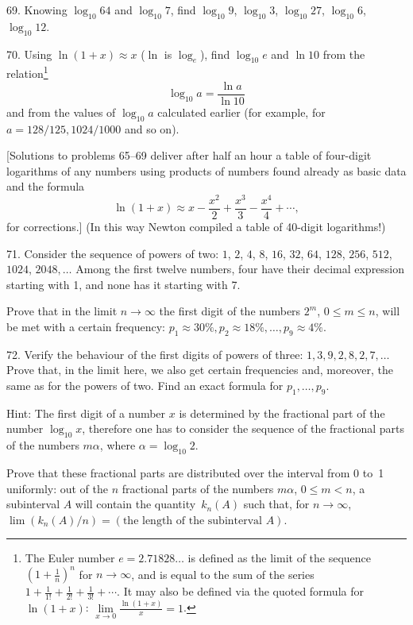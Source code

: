 \begin{problem}{69.}
	Knowing $\log_{10} 64$ and $\log_{10} 7$, find $\log_{10} 9$, $\log_{10} 3$,
    $\log_{10} 27$, $\log_{10} 6$, $\log_{10} 12$.
\end{problem}

\begin{problem}{70.}
	Using $\ln (1+x) \approx x$ ($\ln$ is $\log_e$), find $\log_{10} e$ and
    $\ln 10$ from the relation\footnote{The Euler number $e = 2{.}71828\dots$ is defined as the limit of the sequence
	$\left(1+\frac{1}{n}\right)^n$ for $n\to \infty$, and is equal to the sum of the series
	$1+\frac{1}{1!} +\frac{1}{2!}+\frac{1}{3!}+\dotsb$. It may also be defined via the quoted formula for
	 $\ln (1+x)$: $\lim\limits_{x\to 0}\frac{\ln(1+x)}{x} = 1$.}
	\begin{equation*}
		\log_{10} a=\frac{\ln a}{\ln 10}
	\end{equation*}
	and from the values of $\log_{10} a$ calculated earlier (for example, for $a=128/125, 1024/1000$
	and so on).

	[Solutions to problems 65--69 deliver after half an hour a table of four-digit logarithms of any numbers using
	products of numbers found already as basic data and the formula
	\begin{equation*}
		\ln (1+x) \approx x-\frac{x^2}{2}+\frac{x^3}{3}-\frac{x^4}{4}+\dotsb,
	\end{equation*}
	for corrections.] (In this way Newton compiled a table of
	40-digit logarithms!)
\end{problem}

\begin{problem}{71.}
	Consider the sequence of powers of two: $1$, $2$, $4$, $8$, $16$, $32$, $64$,
	$128$, $256$, $512$, $1024$, $2048, \dotsc$ Among the first twelve numbers, four have their decimal expression
	starting with 1, and none has it starting with 7.

	Prove that in the limit $n \to \infty$ the first digit of the numbers $2^m$,
	$0\leqslant m \leqslant n$, will be met with a certain frequency:
	$p_1 \approx 30\%, p_2 \approx 18\%, \dotsc, p_9 \approx 4\%$.
\end{problem}

\begin{problem}{72.}
	Verify the behaviour of the first digits of powers of three: $1,
	3, 9, 2, 8, 2, 7, \dotsc$ Prove that, in the limit here, we also
	get certain frequencies and, moreover, the same as for the powers of two.
	Find an exact formula for $p_1, \dotsc, p_9$.

	\begin{note}{Hint:}
		The first digit of a number $x$ is determined by the fractional part
		of the number $\log_{10} x$, therefore one has to consider the sequence of the fractional parts of
		the numbers $m \alpha$, where $\alpha=\log_{10} 2$.
	\end{note}
	Prove that these fractional parts are distributed over the interval from 0 to~1
	uniformly: out of the $n$ fractional parts of the numbers $m \alpha$, $0 \leqslant m<n$,
	a subinterval $A$ will contain the quantity~$k_n (A)$ such that, for $n \to \infty$,
	$\lim (k_n (A)/n)=(\text{the length of the subinterval~$A$})$.
\end{problem}

